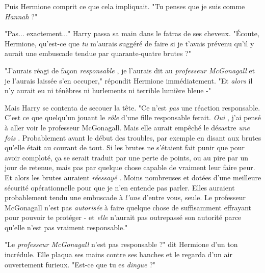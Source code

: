 Puis Hermione comprit ce que cela impliquait. "Tu penses que je suis comme \emph{Hannah}  ?"

"Pas... exactement..." Harry passa sa main dans le fatras de ses cheveux. "Écoute, Hermione, qu'est-ce que \emph{tu}  m'aurais suggéré de faire si je t'avais prévenu qu'il y aurait une embuscade tendue par quarante-quatre brutes ?"

"J'aurais réagi de façon \emph{responsable} , je l'aurais dit au \emph{professeur McGonagall}  et je l'aurais laissée s'en occuper," répondit Hermione immédiatement. "Et \emph{alors}  il n'y aurait eu ni ténèbres ni hurlements ni terrible lumière bleue -"

Mais Harry se contenta de secouer la tête. "Ce n'est \emph{pas}  une réaction responsable. C'est ce que quelqu'un jouant le \emph{rôle}  d'une fille responsable ferait. \emph{Oui} , j'ai pensé à aller voir le professeur McGonagall. Mais elle aurait empêché le désastre \emph{une fois} . Probablement avant le début des troubles, par exemple en disant aux brutes qu'elle était au courant de tout. Si les brutes ne s'étaient fait punir que pour avoir comploté, ça se serait traduit par une perte de points, ou au pire par un jour de retenue, mais pas par quelque chose capable de vraiment leur faire peur. Et alors les brutes auraient \emph{réessayé} . Moins nombreuses et dotées d'une meilleure sécurité opérationnelle pour que je n'en entende pas parler. Elles auraient probablement tendu une embuscade à \emph{l'une}  d'entre vous, seule. Le professeur McGonagall n'est pas \emph{autorisée}  à faire quelque chose de suffisamment effrayant pour pouvoir te protéger - et \emph{elle } n'aurait pas outrepassé son autorité parce qu'elle n'est pas vraiment responsable."

"Le \emph{professeur McGonagall}  n'est pas responsable ?" dit Hermione d'un ton incrédule. Elle plaqua ses mains contre ses hanches et le regarda d'un air ouvertement furieux. "Est-ce que tu es \emph{dingue}  ?"


